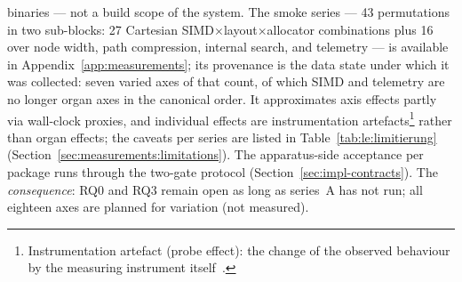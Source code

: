 \begin{nurlang}
binaries --- not a build scope of the system. The smoke series --- 43 permutations in two sub-blocks: 27 Cartesian
SIMD$\times$layout$\times$allocator combinations plus 16 over node width, path compression,
internal search, and telemetry --- is available in Appendix~\ref{app:measurements}; its provenance
is the data state under which it was collected: seven varied axes of that count, of which SIMD and
telemetry are no longer organ axes in the canonical order. It approximates axis effects partly via
wall-clock proxies, and individual effects are instrumentation artefacts\footnote{Instrumentation
artefact (probe effect): the change of the observed behaviour by the measuring instrument
itself~\cite{gait1986probe}.} rather than organ effects; the caveats per series are listed in
Table~\ref{tab:le:limitierung} (Section~\ref{sec:measurements:limitations}). The apparatus-side
acceptance per package runs through the two-gate protocol (Section~\ref{sec:impl-contracts}). The
\emph{consequence}: RQ0 and RQ3 remain open as long as series~A has not run; all eighteen axes are
planned for variation (not measured).
\end{nurlang}
